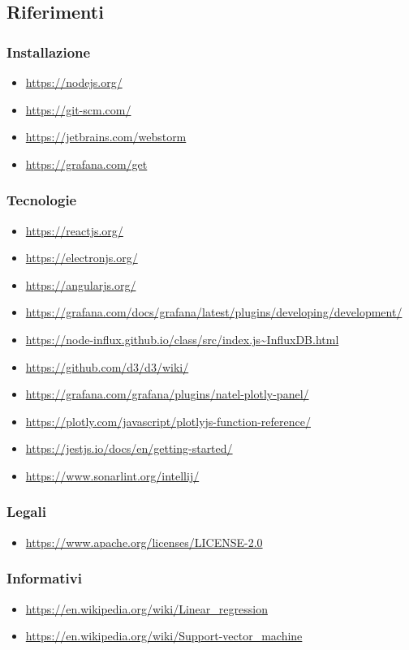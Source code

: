 \subsection{Riferimenti}
\subsubsection{Installazione}
\begin{itemize}
	\item \url{https://nodejs.org/}
	\item \url{https://git-scm.com/}
	\item \url{https://jetbrains.com/webstorm}
	\item \url{https://grafana.com/get}
\end{itemize}
\subsubsection{Tecnologie}
\begin{itemize}
	\item \url{https://reactjs.org/}
	\item \url{https://electronjs.org/}
	\item \url{https://angularjs.org/}
	\item \url{https://grafana.com/docs/grafana/latest/plugins/developing/development/}
	\item \url{https://node-influx.github.io/class/src/index.js~InfluxDB.html}
	\item \url{https://github.com/d3/d3/wiki/}
	\item \url{https://grafana.com/grafana/plugins/natel-plotly-panel/}
	\item \url{https://plotly.com/javascript/plotlyjs-function-reference/}
	\item \url{https://jestjs.io/docs/en/getting-started/}
	\item \url{https://www.sonarlint.org/intellij/}
\end{itemize}
\subsubsection{Legali}
\begin{itemize}
	\item \url{https://www.apache.org/licenses/LICENSE-2.0}
\end{itemize}
\subsubsection{Informativi}
\begin{itemize}
	\item \url{https://en.wikipedia.org/wiki/Linear_regression}
	\item \url{https://en.wikipedia.org/wiki/Support-vector_machine}
\end{itemize}
